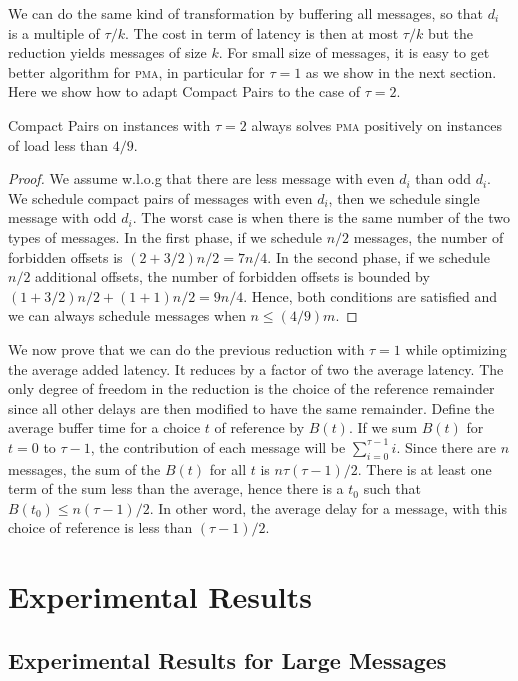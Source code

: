 \documentclass[a4paper,UKenglish,cleveref, autoref, thm-restate]{lipics-v2019}
\newcommand\pma{\textsc{pma}\xspace}
\begin{document}
We can do the same kind of transformation by buffering all 
messages, so that $d_i$ is a multiple of $\tau / k$. The cost in term
of latency is then at most $\tau / k$ but the reduction yields messages of size $k$.
For small size of messages, it is easy to get better algorithm for \pma, in particular for $\tau = 1$ as we show in the next section. Here we show how to adapt Compact Pairs to the case of $\tau = 2$.

\begin{theorem}
Compact Pairs on instances with $\tau =2$ always solves \pma positively on instances of load less than $4/9$.
\end{theorem}
\begin{proof}
We assume w.l.o.g that there are less message with even $d_i$ than odd $d_i$.
We schedule compact pairs of messages with even $d_i$, then we schedule single message with odd $d_i$. The worst case is when there is the same number of the two types of messages. In the first phase, if we schedule
 $n/2$ messages, the number of forbidden offsets is $(2 + 3/2)n/2 = 7n/4$. In the second phase,
 if we schedule $n/2$ additional offsets, the number of forbidden offsets is bounded by 
$ (1 + 3/2) n/2  + (1 + 1)n/2 = 9n/4$.
Hence, both conditions are satisfied and we can always schedule messages when $n \leq (4/9)m$.
\end{proof}


We now prove that we can do the previous reduction with $\tau=1$ while optimizing the average added latency. It reduces by a factor of two the average latency. The only degree of freedom in the reduction is the choice of the reference remainder since all other delays are then modified to have the same remainder.
Define the average buffer time for a choice $t$ of reference by $B(t)$. 
If we sum $B(t)$ for $t=0$ to $\tau-1$, the contribution of each message 
will be $\sum_{i=0}^{\tau-1} i$. Since there are $n$ messages, the sum of the $B(t)$ for all $t$ is $n \tau (\tau-1)/2$. There is at least one term of the sum less than the average,
hence there is a $t_0$ such that $B(t_0) \leq n (\tau-1)/2$. In other word, the average
delay for a message, with this choice of reference is less than $(\tau -1)/2$.

\section{Experimental Results}


\subsection{Experimental Results for Large Messages} \label{sec:perf_large}
\end{document}
